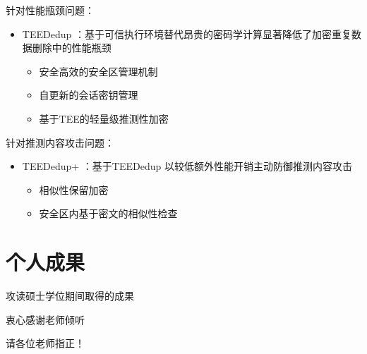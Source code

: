 \documentclass{beamer}
\newcommand{\sysnameS}{TEEDedup }
\newcommand{\prototype}{TEEDedup+ }
\begin{document}
\begin{frame}{}
    \begin{textbox}{针对性能瓶颈问题：}
        \begin{itemize}
            \item \sysnameS ：基于可信执行环境替代昂贵的密码学计算显著降低了加密重复数据删除中的性能瓶颈
                  \begin{itemize}
                      \item 安全高效的安全区管理机制
                      \item 自更新的会话密钥管理
                      \item 基于TEE的轻量级推测性加密
                  \end{itemize}
        \end{itemize}
    \end{textbox}
    \begin{textbox}{针对推测内容攻击问题：}
        \begin{itemize}
            \item \prototype ：基于\sysnameS 以较低额外性能开销主动防御推测内容攻击
                  \begin{itemize}
                      \item 相似性保留加密
                      \item 安全区内基于密文的相似性检查
                  \end{itemize}
        \end{itemize}
    \end{textbox}
\end{frame}

\section{个人成果}

\begin{frame}[allowframebreaks]{攻读硕士学位期间取得的成果}
    \newcommand{\bstlabelmark}{lo}
    \nocite{*}
    
    
\end{frame}

\begin{frame}
    \begin{center}
        {\Huge 衷心感谢老师倾听}

        {\Huge 请各位老师指正！}
    \end{center}
\end{frame}
\end{document}
